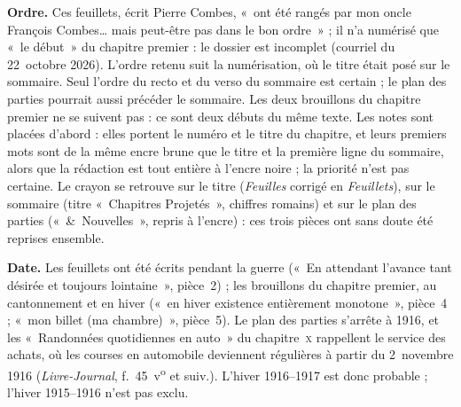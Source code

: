 \textbf{Ordre.} Ces feuillets, écrit Pierre Combes, «~ont été rangés par mon oncle François Combes… mais peut-être pas dans le bon ordre~» ; il n'a numérisé que «~le début~» du chapitre premier : le dossier est incomplet (courriel du 22~octobre 2026). L'ordre retenu suit la numérisation, où le titre était posé sur le sommaire. Seul l'ordre du recto et du verso du sommaire est certain ; le plan des parties pourrait aussi précéder le sommaire. Les deux brouillons du chapitre premier ne se suivent pas : ce sont deux débuts du même texte. Les notes sont placées d'abord : elles portent le numéro et le titre du chapitre, et leurs premiers mots sont de la même encre brune que le titre et la première ligne du sommaire, alors que la rédaction est tout entière à l'encre noire ; la priorité n'est pas certaine. Le crayon se retrouve sur le titre (\textit{Feuilles} corrigé en \textit{Feuillets}), sur le sommaire (titre «~Chapitres Projetés~», chiffres romains) et sur le plan des parties («~\&~Nouvelles~», repris à l'encre) : ces trois pièces ont sans doute été reprises ensemble.

\textbf{Date.} Les feuillets ont été écrits pendant la guerre («~En attendant l'avance tant désirée et toujours lointaine~», pièce~2) ; les brouillons du chapitre premier, au cantonnement et en hiver («~en hiver existence entièrement monotone~», pièce~4 ; «~mon billet (ma chambre)~», pièce~5). Le plan des parties s'arrête à 1916, et les «~Randonnées quotidiennes en auto~» du chapitre~\textsc{x} rappellent le service des achats, où les courses en automobile deviennent régulières à partir du 2~novembre 1916 (\textit{Livre-Journal}, f.~45~v\textsuperscript{o} et suiv.). L'hiver 1916--1917 est donc probable ; l'hiver 1915--1916 n'est pas exclu.

